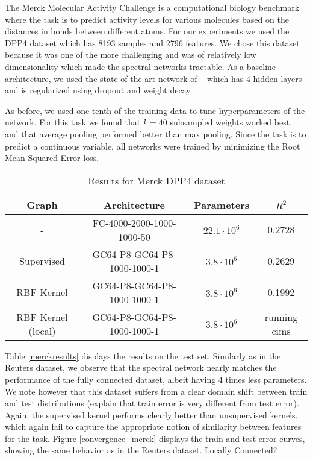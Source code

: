 The Merck Molecular Activity Challenge is a computational biology benchmark where the task is to predict activity levels for various molecules based on the distances in bonds between different atoms. For our experiments we used the DPP4 dataset which has 8193 samples and 2796 features. We chose this dataset because it was one of the more challenging and was of relatively low dimensionality which made the spectral networks tractable. As a baseline architecture, we used the state-of-the-art network of ~\cite{ma2015} which has 4 hidden layers and is regularized using dropout and weight decay. 

As before, we used one-tenth of the training data to tune hyperparameters of the network. For this task we found that $k=40$ subsampled weights worked best, and that average pooling performed better than max pooling. Since the task is to predict a continuous variable, all networks were trained by minimizing the Root Mean-Squared Error loss.

\begin{table}[H]
\caption{Results for Merck DPP4 dataset}
\begin{center}
\begin{tabular}{|c|c|c|c|}
\hline
Graph & Architecture & Parameters & $R^2$\\
\hline
- &FC-4000-2000-1000-1000-50 & $22.1 \cdot 10^6$ & 0.2728 \\
Supervised & GC64-P8-GC64-P8-1000-1000-1 & $3.8\cdot 10^6$ & 0.2629 \\
RBF Kernel & GC64-P8-GC64-P8-1000-1000-1 & $3.8\cdot 10^6$ & 0.1992 \\
RBF Kernel (local) & GC64-P8-GC64-P8-1000-1000-1 & $3.8\cdot 10^6$ & running cims \\
\hline
\end{tabular}
\end{center}
\end{table}


Table \ref{merckresults} displays the results on the test set. Similarly as in the Reuters dataset, we observe that the spectral network nearly matches the performance of the fully connected dataset, albeit having $4$ times less parameters. We note however that this dataset suffers from a clear domain shift between train and test distributions (explain that train error is very different from test error).
Again, the supervised kernel performs clearly better than unsupervised kernels, which again fail to capture the appropriate notion of similarity between features for the task. Figure \ref{convergence_merck} displays the train and test error curves, showing the same behavior as in the Reuters dataset. Locally Connected? 


